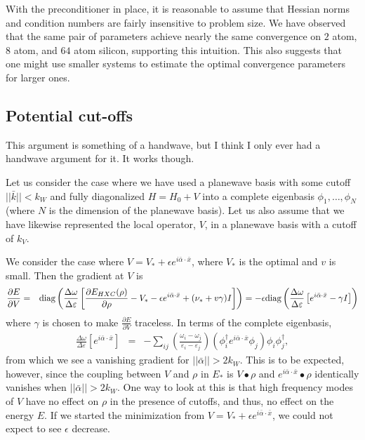 \documentclass{article}
\newcommand{\beas}{\begin{eqnarray*}}
\newcommand{\enas}{\end{eqnarray*}}
\newcommand{\bea}{\begin{eqnarray}} \newcommand{\ena}{\end{eqnarray}}
\newcommand{\Vscp}{V}
\newcommand{\Red}{\color{red}}
\begin{document}
With the preconditioner in place, it is reasonable to assume that
Hessian norms and condition numbers are fairly insensitive to problem
size.  We have observed that the same pair of parameters achieve
nearly the same convergence on $2$ atom, $8$ atom, and $64$ atom
silicon, supporting this intuition.  This also suggests that one
might use smaller systems to estimate the optimal convergence
parameters for larger ones.

\subsection{Potential cut-offs}

{\Red This argument is something of a handwave, but I think I only
ever had a handwave argument for it. It works though.}

Let us consider the case where we have used a planewave basis with
some cutoff $||\bar{k}|| < k_W$ and fully diagonalized $H = H_0 + \Vscp$
into a complete eigenbasis $\phi_1,\ldots,\phi_N$ (where $N$ is the
dimension of the planewave basis).  Let us also assume that we have
likewise represented the local operator, $\Vscp$,
in a planewave basis with a cutoff of $k_V$.

We consider the case where
$\Vscp = \Vscp_* + \epsilon e^{i \bar{\alpha} \cdot \bar{x}}$,
where $\Vscp_*$ is the optimal and $v$ is small.  Then the gradient at
$\Vscp$ is
\beas
  \frac{\partial E}{\partial V}
  &=& \diag\left( \frac{\Delta \omega}{\Delta \varepsilon} \left[
       \frac{\partial E_{HXC}(\rho)}{\partial \rho}
       - \Vscp_* - \epsilon e^{i \bar{\alpha}\cdot \bar{x}}
       + (\nu_*+v \gamma) I
       \right]\right)
  = -\epsilon\diag\left( \frac{\Delta \omega}{\Delta \varepsilon} \left[
        e^{i \bar{\alpha}\cdot \bar{x}} - \gamma I
       \right]\right)
\enas
where $\gamma$ is chosen to make $\frac{\partial E}{\partial V}$
traceless.  In terms of the complete eigenbasis,
\bea
\label{deltar_eq}
  \frac{\Delta \omega}{\Delta \varepsilon}
       \left[
        e^{i \bar{\alpha}\cdot \bar{x}}
       \right]
  &=& - \sum_{ij}
    \left(\frac{\omega_i - \omega_j}{\varepsilon_i-\varepsilon_j}\right)
    \left(\phi_i^{\dagger} e^{i \bar{\alpha} \cdot \bar{x}} \phi_j\right)
    \phi_i \phi_j^{\dagger},
\ena
from which we see a vanishing gradient for $||\bar{\alpha}|| > 2 k_W$.
This is to be expected, however, since the coupling between $\Vscp$ and
$\rho$ in $E_*$ is $\Vscp \bullet \rho$ and
$e^{i \bar{\alpha} \cdot \bar{x}} \bullet \rho$ identically vanishes
when $||\bar{\alpha}|| > 2 k_W$.  One way to look at this is that high
frequency modes of $\Vscp$ have no effect on $\rho$ in the presence of
cutoffs, and thus, no effect on the energy $E$.  If we started the
minimization from
$\Vscp=\Vscp_* + \epsilon e^{i \bar{\alpha} \cdot \bar{x}}$, we could not
expect to see $\epsilon$ decrease.
\end{document}
